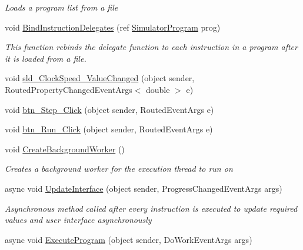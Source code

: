 \begin{DoxyCompactItemize}
\begin{DoxyCompactList}\small\item\em Loads a program list from a file \end{DoxyCompactList}\item 
void \hyperlink{class_c_p_u___o_s___simulator_1_1_main_window_afe4c815db0eb51ebc480374f5af09d0c}{Bind\+Instruction\+Delegates} (ref \hyperlink{class_c_p_u___o_s___simulator_1_1_c_p_u_1_1_simulator_program}{Simulator\+Program} prog)
\begin{DoxyCompactList}\small\item\em This function rebinds the delegate function to each instruction in a program after it is loaded from a file. \end{DoxyCompactList}\item 
void \hyperlink{class_c_p_u___o_s___simulator_1_1_main_window_ace253c0b4beef8898af97df25666df2f}{sld\+\_\+\+Clock\+Speed\+\_\+\+Value\+Changed} (object sender, Routed\+Property\+Changed\+Event\+Args$<$ double $>$ e)
\item 
void \hyperlink{class_c_p_u___o_s___simulator_1_1_main_window_a897049d123dd2ecf2820b02205ce1969}{btn\+\_\+\+Step\+\_\+\+Click} (object sender, Routed\+Event\+Args e)
\item 
void \hyperlink{class_c_p_u___o_s___simulator_1_1_main_window_a1f4dedca9ad81ea1c92637759515797f}{btn\+\_\+\+Run\+\_\+\+Click} (object sender, Routed\+Event\+Args e)
\item 
void \hyperlink{class_c_p_u___o_s___simulator_1_1_main_window_ad225bd7394d6ad45de9db58b562b91f7}{Create\+Background\+Worker} ()
\begin{DoxyCompactList}\small\item\em Creates a background worker for the execution thread to run on \end{DoxyCompactList}\item 
async void \hyperlink{class_c_p_u___o_s___simulator_1_1_main_window_ac1b417fb7599c297836465c57a14ca6f}{Update\+Interface} (object sender, Progress\+Changed\+Event\+Args args)
\begin{DoxyCompactList}\small\item\em Asynchronous method called after every instruction is executed to update required values and user interface asynchronously \end{DoxyCompactList}\item 
async void \hyperlink{class_c_p_u___o_s___simulator_1_1_main_window_ae16be09ed60807bb299da474882d94d0}{Execute\+Program} (object sender, Do\+Work\+Event\+Args args)

\end{DoxyCompactItemize}
